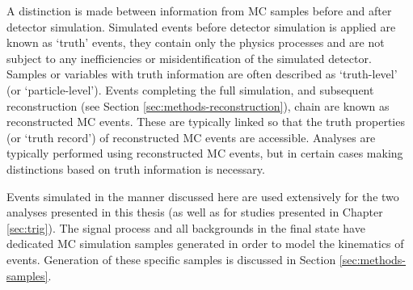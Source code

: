 A distinction is made between information from \ac{MC} samples before and after
detector simulation. Simulated events before detector simulation is applied are
known as `truth' events, they contain only the physics processes and are not
subject to any inefficiencies or misidentification of the simulated detector.
Samples or variables with truth information are often described as `truth-level'
(or `particle-level').
Events completing the full simulation, and subsequent reconstruction (see Section
\ref{sec:methods-reconstruction}), chain are known as reconstructed \ac{MC}
events. These are typically linked so that the truth properties (or `truth
record') of reconstructed \ac{MC} events are accessible. Analyses are typically
performed using reconstructed \ac{MC} events, but in certain cases making
distinctions based on truth information is necessary.

Events simulated in the manner discussed here are used extensively for the two
analyses presented in this thesis (as well as for studies presented in Chapter
\ref{sec:trig}). The signal process and all backgrounds in the final state have
dedicated \ac{MC} simulation samples generated in order to model the kinematics
of events. Generation of these specific samples is discussed in Section
\ref{sec:methods-samples}.
